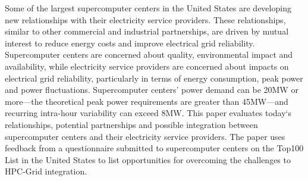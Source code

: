 Some of the largest supercomputer centers in the United States are developing 
new relationships with their electricity service providers. 
These relationships, similar to other commercial and industrial partnerships, are 
driven by mutual interest to reduce energy costs and improve electrical grid reliability.
Supercomputer centers are concerned about quality, environmental 
impact and availability,
while electricity service providers are concerned about impacts
on electrical grid reliability, particularly in terms of energy consumption, peak power and power fluctuations.
Supercomputer centers' power demand can be 20MW or more---the 
theoretical peak power requirements are greater than 45MW---and recurring 
intra-hour variability can exceed 8MW.
This paper evaluates today`s relationships, potential partnerships and possible 
integration between supercomputer centers and their electricity service providers.
The paper uses feedback from a questionnaire submitted to supercomputer centers 
on the Top100 List in the United States to list opportunities for overcoming the 
challenges to HPC-Grid integration.

